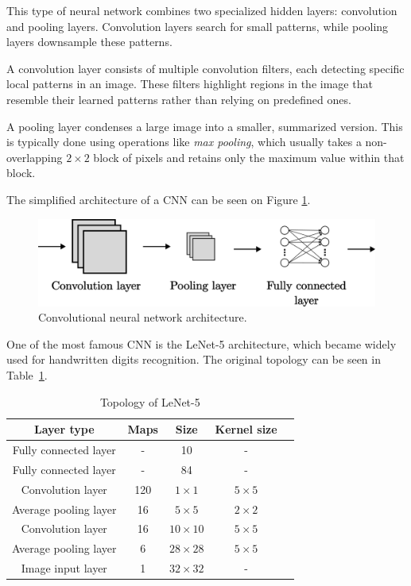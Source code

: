 \documentclass[a4paper,oneside,onecolumn,12pt]{book}
\begin{document}
		This type of neural network combines two specialized hidden layers: convolution and pooling layers. Convolution layers search for small patterns, while pooling layers downsample these patterns.

		A convolution layer consists of multiple convolution filters, each detecting specific local patterns in an image. These filters highlight regions in the image that resemble their learned patterns rather than relying on predefined ones.

		A pooling layer condenses a large image into a smaller, summarized version. This is typically done using operations like \textit{max pooling}, which usually takes a non-overlapping $2 \times 2$ block of pixels and retains only the maximum value within that block. \cite{AISL}

		The simplified architecture of a CNN can be seen on Figure \ref{fig:cnn}.
		\begin{figure}[H]
		\begin{center}
			\includegraphics[keepaspectratio,width=14cm]{kep/cnn.png}
			\caption{Convolutional neural network architecture.}
			\label{fig:cnn}
		\end{center}
		\end{figure}
		
		One of the most famous CNN is the LeNet-5 architecture, which became widely used for handwritten digits recognition. The original topology can be seen in Table~\ref{table:lenet_topology}.
		\begin{table}[H]
		\begin{center}
		\begin{tabular}{|c|c|c|c|c|}
		\hline
		\textbf{Layer type} & \textbf{Maps} & \textbf{Size} & \textbf{Kernel size} \\
		\hline
		Fully connected layer & - & 10 & - \\ 
		\hline
		Fully connected layer & - & 84 & - \\ 
		\hline
		Convolution layer & 120 & $1 \times 1$ & $5 \times 5$ \\ 
		\hline
		Average pooling layer & 16 & $5 \times 5$ & $2 \times 2$ \\
		\hline
		Convolution layer & 16 & $10 \times 10$ & $5 \times 5$ \\
		\hline
		Average pooling layer & 6 & $28 \times 28$ & $5 \times 5$ \\
		\hline
		Image input layer & 1 & $32 \times 32$ & - \\
		\hline
		\end{tabular}
		\end{center}
		\caption{Topology of LeNet-5}
		\label{table:lenet_topology}
		\end{table}
		
\end{document}
